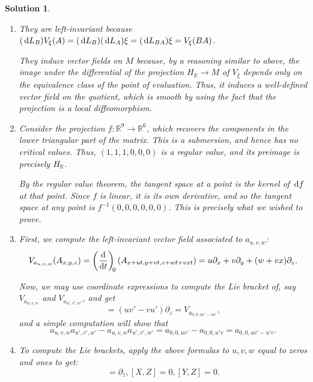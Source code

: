 \documentclass{article}
\theoremstyle{plain}
\theoremstyle{nonumberplain}
\newtheorem{sol}{Solution}
\newcommand{\R}{\mathbb{R}}
\begin{document}
\begin{sol}
\begin{enumerate}
\item They are left-invariant because $(\dl L_B) V_{\xi}(A) = (\dl L_B)(\dl L_A) \xi = (\dl L_{BA}) \xi = V_\xi(BA)$.

They induce vector fields on $M$ because, by a reasoning similar to above, the image under the differential of the projection $H_\R \to M$ of $V_\xi$ depends only on the equivalence class of the point of evaluation. Thus, it induces a well-defined vector field on the quotient, which is smooth by using the fact that the projection is a local diffeomorphism.

\item Consider the projection $f \colon \R^9 \to \R^6$, which recovers the components in the lower triangular part of the matrix. This is a submersion, and hence has no critical values. Thus, $(1,1,1,0,0,0)$ is a regular value, and its preimage is precisely $H_\R$.

By the regular value theorem, the tangent space at a point is the kernel of $\dl f$ at that point. Since $f$ is linear, it is its own derivative, and so the tangent space at any point is $f^{-1}(0,0,0,0,0,0)$. This is precisely what we wished to prove.

\item First, we compute the left-invariant vector field associated to $a_{u,v,w}$:
\begin{equation}
V_{a_{u,v,w}}(A_{x,y,z}) = \diff{}t[0] \left( A_{x+ut,y+vt,z+wt + v x t} \right) = u \partial_x + v \partial_y + (w + v x) \partial_z.
\end{equation}

Now, we may use coordinate expressions to compute the Lie bracket of, say $V_{a_{u,v,w}}$ and $V_{a_{u',v',w'}}$, and get
\begin{equation}
[V_{a_{u,v,w}}, V_{a_{u',v',w'}}] = (u v' - v u') \partial_z = V_{a_{0,0,u v'-v u'}},
\end{equation}
and a simple computation will show that
\begin{equation}
a_{u,v,w} a_{u',v',w'} - a_{u,v,w} a_{u',v',w'} = a_{0,0, u v'} - a_{0,0,u' v} = a_{0,0,uv'-u'v}.
\end{equation}

\item To compute the Lie brackets, apply the above formulas to $u,v,w$ equal to zeros and ones to get:
\begin{equation}
[X,Y] = \partial_z, [X,Z] = 0, [Y,Z] = 0.
\end{equation}


\end{enumerate}
\end{sol}
\end{document}
